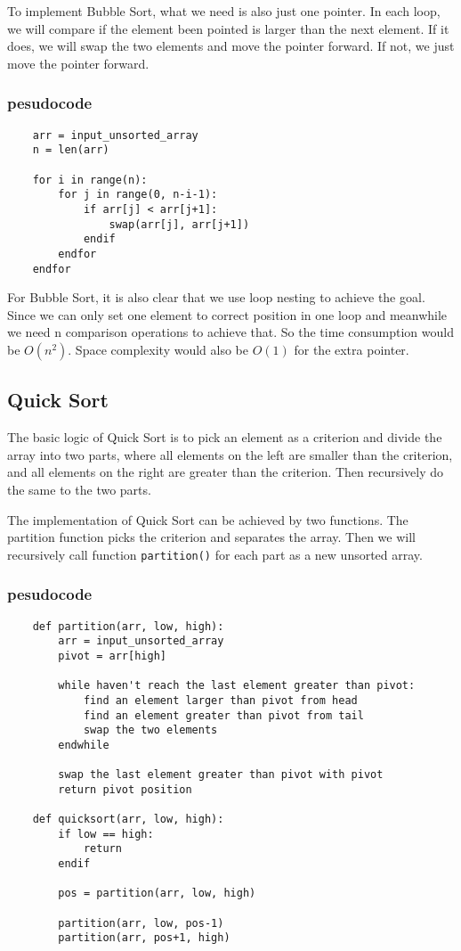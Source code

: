 \documentclass[12pt]{article}
\begin{document}
To implement Bubble Sort, what we need is also just one pointer. In each loop, we will compare if the element been pointed is larger than the next element. If it does, we will swap the two elements and move the pointer forward. If not, we just move the pointer forward.

\subsubsection*{pesudocode}

\begin{verbatim}
    arr = input_unsorted_array
    n = len(arr)

    for i in range(n):
        for j in range(0, n-i-1):
            if arr[j] < arr[j+1]:
                swap(arr[j], arr[j+1])
            endif
        endfor
    endfor

\end{verbatim}

For Bubble Sort, it is also clear that we use loop nesting to achieve the goal. Since we can only set one element to correct position in one loop and meanwhile we need n comparison operations to achieve that. So the time consumption would be $O(n^2)$. Space complexity would also be $O(1)$ for the extra pointer.

\subsection{Quick Sort}

The basic logic of Quick Sort is to pick an element as a criterion and divide the array 
into two parts, where all elements on the left are smaller than the criterion, and all 
elements on the right are greater than the criterion. Then recursively do the same to the 
two parts.

The implementation of Quick Sort can be achieved by two functions. The partition function 
picks the criterion and separates the array. Then we will recursively call 
function \verb|partition()| for each part as a new unsorted array.

\subsubsection*{pesudocode}
\begin{verbatim}
    def partition(arr, low, high):
        arr = input_unsorted_array
        pivot = arr[high]

        while haven't reach the last element greater than pivot:
            find an element larger than pivot from head
            find an element greater than pivot from tail
            swap the two elements
        endwhile

        swap the last element greater than pivot with pivot
        return pivot position

    def quicksort(arr, low, high):
        if low == high:
            return
        endif
        
        pos = partition(arr, low, high)

        partition(arr, low, pos-1)
        partition(arr, pos+1, high)
        
\end{verbatim}
\end{document}
